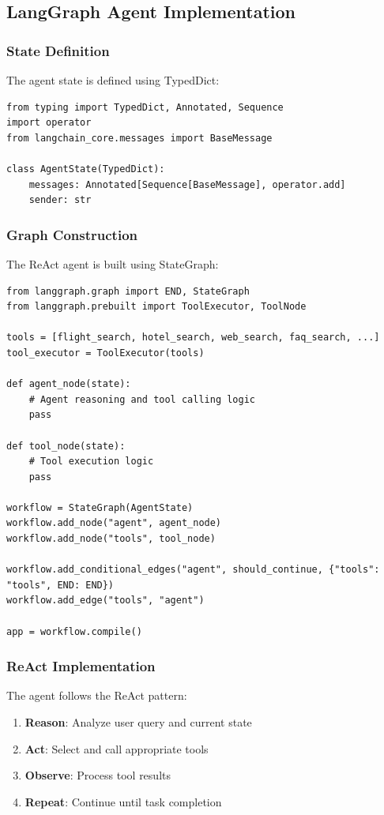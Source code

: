\documentclass[12pt,a4paper]{article}
\begin{document}
\subsection{LangGraph Agent Implementation}

\subsubsection{State Definition}
The agent state is defined using TypedDict:

\begin{lstlisting}
from typing import TypedDict, Annotated, Sequence
import operator
from langchain_core.messages import BaseMessage

class AgentState(TypedDict):
    messages: Annotated[Sequence[BaseMessage], operator.add]
    sender: str
\end{lstlisting}

\subsubsection{Graph Construction}
The ReAct agent is built using StateGraph:

\begin{lstlisting}
from langgraph.graph import END, StateGraph
from langgraph.prebuilt import ToolExecutor, ToolNode

tools = [flight_search, hotel_search, web_search, faq_search, ...]
tool_executor = ToolExecutor(tools)

def agent_node(state):
    # Agent reasoning and tool calling logic
    pass

def tool_node(state):
    # Tool execution logic
    pass

workflow = StateGraph(AgentState)
workflow.add_node("agent", agent_node)
workflow.add_node("tools", tool_node)

workflow.add_conditional_edges("agent", should_continue, {"tools": "tools", END: END})
workflow.add_edge("tools", "agent")

app = workflow.compile()
\end{lstlisting}

\subsubsection{ReAct Implementation}
The agent follows the ReAct pattern:

\begin{enumerate}
\item \textbf{Reason}: Analyze user query and current state
\item \textbf{Act}: Select and call appropriate tools
\item \textbf{Observe}: Process tool results
\item \textbf{Repeat}: Continue until task completion
\end{enumerate}
\end{document}
